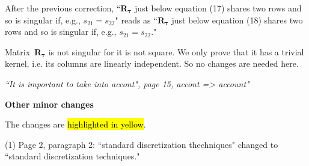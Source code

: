 \documentclass[12pt]{article}
\begin{document}
After the previous correction, ``$\mathbf{R}_{\boldsymbol{\tau}}$ just below equation (17) shares two rows and so is singular if, e.g., $s_{21}=s_{22}$" reads as ``$\mathbf{R}_{\boldsymbol{\tau}}$ just below equation (18) shares two rows and so is singular if, e.g., $s_{21}=s_{22}$."

Matrix~$\mathbf{R}_{\boldsymbol{\tau}}$ is not singular for it is not square. We only prove that it has a trivial kernel, i.e. its columns are linearly independent. So no changes are needed here. 

\emph{``It is important to take into accont", page 15, accont => account"}

\textbf{Other minor changes}

The changes are \hl{highlighted in yellow}.

(1) Page 2, paragraph 2: ``standard discretization thechniques" changed to ``standard discretization techniques."
\end{document}
